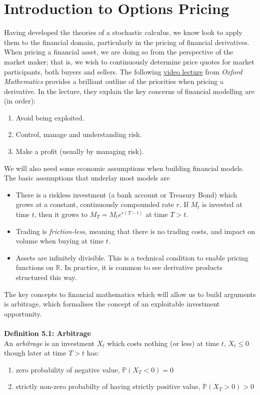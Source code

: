 \documentclass{article}
\begin{document}
\section{Introduction to Options Pricing}
Having developed the theories of a stochastic calculus, we know look to apply them to the financial domain, particularly in the pricing of financial derivatives. When pricing a financial asset, we are doing so from the perspective of the market maker; that is, we wish to continuously determine price quotes for market participants, both buyers and sellers. The following \href{https://www.youtube.com/watch?v=j1oV2BTSi1s&t=0s}{video lecture} from \textit{Oxford Mathematics} provides a brilliant outline of the priorities when pricing a derivative. In the lecture, they explain the key concerns of financial modelling are (in order): 
\begin{enumerate}
    \item Avoid being exploited. 
    \item Control, manage and understanding risk. 
    \item Make a profit (usually by managing risk). 
\end{enumerate}
We will also need some economic assumptions when building financial models. The basic assumptions that underlay most models are \begin{itemize}
    \item There is a riskless investment (a bank account or Treasury Bond) which grows at a constant, continuously compounded rate $r$.
    If $M_t$ is invested at time $t$, then it grows to $M_T = M_t e^{r(T-t)}$ at time $T>t$. 
    \item Trading is \textit{friction-less}, meaning that there is no trading costs, and impact on volume when buying at time $t$.
    \item Assets are infinitely divisible. This is a technical condition to enable pricing functions on $\mathbb{R}$. In practice, it is common to see derivative products structured this way. 
\end{itemize}
The key concepts to financial mathematics which will allow us to build arguments is arbitrage, which formalises the concept of an exploitable investment opportunity. \\
\\
\textbf{Definition 5.1: Arbitrage} \\
An \textit{arbitrage} is an investment $X_t$ which costs nothing (or less) at time $t$, $X_t\leq0$ though later at time $T>t$ has: \begin{enumerate}
    \item zero probability of negative value, $\mathbb{P}(X_T <0)=0$
    \item strictly non-zero probabilty of having strictly positive value, $\mathbb{P}(X_T >0)>0$
\end{enumerate}
\end{document}

